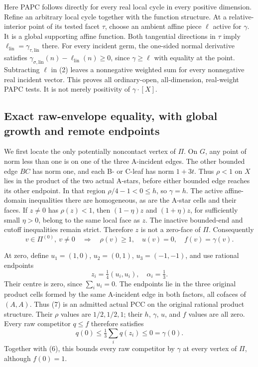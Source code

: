 \documentclass[
  10pt,
]{article}
\begin{document}
Here PAPC follows directly for every real local cycle in every positive
dimension. Refine an arbitrary local cycle together with the function
structure. At a relative-interior point of its tested facet \(\tau\),
choose an ambient affine piece \(\ell\) active for \(\gamma\). It is a
global supporting affine function. Both tangential directions in
\(\tau\) imply \(\ell_{\mathrm{lin}}=\gamma_{\tau,\mathrm{lin}}\) there.
For every incident germ, the one-sided normal derivative satisfies
\(\gamma_{\sigma,\mathrm{lin}}(n)-\ell_{\mathrm{lin}}(n)\geq0\), since
\(\gamma\geq\ell\) with equality at the point. Subtracting \(\ell\) in
(2) leaves a nonnegative weighted sum for every nonnegative real
incident vector. This proves all ordinary-open, all-dimension,
real-weight PAPC tests. It is not merely positivity of
\(\gamma\cdot[X]\).

\subsection{Exact raw-envelope equality, with global growth and remote
endpoints}\label{exact-raw-envelope-equality-with-global-growth-and-remote-endpoints}

We first locate the only potentially noncontact vertex of \(\Pi\). On
\(G\), any point of norm less than one is on one of the three A-incident
edges. The other bounded edge \(BC\) has norm one, and each B- or C-leaf
has norm \(1+3t\). Thus \(\rho<1\) on \(X\) lies in the product of the
two actual A-stars, before either bounded edge reaches its other
endpoint. In that region \(\rho/4-1<0\leq h\), so \(\gamma=h\). The
active affine-domain inequalities there are homogeneous, as are the
A-star cells and their faces. If \(z\ne0\) has \(\rho(z)<1\), then
\((1-\eta)z\) and \((1+\eta)z\), for sufficiently small \(\eta>0\),
belong to the same local face as \(z\). The inactive bounded-end and
cutoff inequalities remain strict. Therefore \(z\) is not a zero-face of
\(\Pi\). Consequently \[
 v\in\Pi^{(0)},\ v\ne0\quad\Longrightarrow\quad\rho(v)\geq1,
 \quad u(v)=0,\quad f(v)=\gamma(v).
 \tag{6}
\]

At zero, define \(u_1=(1,0)\), \(u_2=(0,1)\), \(u_3=(-1,-1)\), and use
rational endpoints \[
 z_i=\tfrac14(u_i,u_i),\quad \alpha_i=\tfrac13.
 \tag{7}
\] Their centre is zero, since \(\sum_i u_i=0\). The endpoints lie in
the three original product cells formed by the same A-incident edge in
both factors, all cofaces of \((A,A)\). Thus (7) is an admitted actual
PCC on the original rational product structure. Their \(\rho\) values
are \(1/2,1/2,1\); their \(h\), \(\gamma\), \(u\), and \(f\) values are
all zero. Every raw competitor \(q\leq f\) therefore satisfies \[
                        q(0)\leq\tfrac13\sum_iq(z_i)\leq0=\gamma(0).
 \tag{8}
\] Together with (6), this bounds every raw competitor by \(\gamma\) at
every vertex of \(\Pi\), although \(f(0)=1\).
\end{document}
